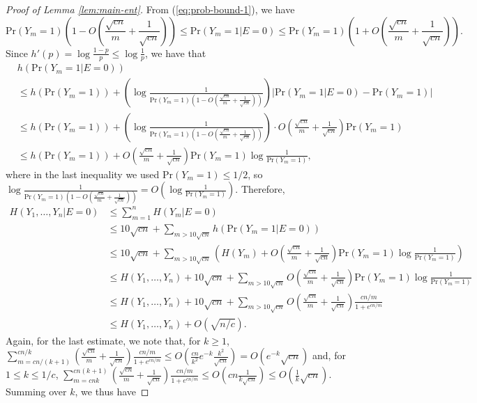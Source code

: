 \documentclass{daj}
\newcommand{\pr}{\mathrm{Pr}}
\begin{document}
\begin{proof}[Proof of Lemma \ref{lem:main-ent}]
From (\ref{eq:prob-bound-1}), we have
\[
    \pr(Y_m=1) \left(1 - O\left(\frac{\sqrt{cn}}{m} + \frac{1}{\sqrt{cn}}\right)\right)\le \pr(Y_m=1|E=0) \le \pr(Y_m=1) \left(1 + O\left(\frac{\sqrt{cn}}{m} + \frac{1}{\sqrt{cn}}\right)\right).
\]
Since $h'(p) = \log \frac{1-p}{p} \le \log \frac 1p$, we have that 
\begin{align*}
    &h(\pr(Y_m=1|E=0)) \\
    &\le h(\pr(Y_m=1)) + \left (\log \frac{1}{\pr(Y_m=1) \left(1 - O\left(\frac{\sqrt{cn}}{m} + \frac{1}{\sqrt{cn}}\right)\right)}\right ) \left | \pr(Y_m=1|E=0)-\pr(Y_m=1)\right |\\
    &\le h(\pr(Y_m=1)) + \left (\log \frac{1}{\pr(Y_m=1) \left(1 - O\left(\frac{\sqrt{cn}}{m} + \frac{1}{\sqrt{cn}}\right)\right)}\right ) \cdot O\left(\frac{\sqrt{cn}}{m} + \frac{1}{\sqrt{cn}}\right) \pr(Y_m=1) \\
    &\le h(\pr(Y_m=1)) +  O\left(\frac{\sqrt{cn}}{m} + \frac{1}{\sqrt{cn}}\right) \pr(Y_m=1) \log \frac{1}{\pr(Y_m=1)},
\end{align*}
where in the last inequality we used $\pr(Y_m=1) \le 1/2$, so $\log \frac{1}{\pr(Y_m=1) \left(1 - O\left(\frac{\sqrt{cn}}{m} + \frac{1}{\sqrt{cn}}\right)\right)} = O\left(\log \frac{1}{\pr(Y_m=1)}\right)$. 
Therefore, 
\begin{align*}
    H(Y_1,\dots,Y_n|E=0) &\le \sum_{m=1}^{n} H(Y_m | E=0)\\
    &\le 10\sqrt{cn} + \sum_{m>10\sqrt{cn}} h(\pr(Y_m=1|E=0)) \\
    &\le 10\sqrt{cn} + \sum_{m>10\sqrt{cn}} \left(H(Y_m) + O\left(\frac{\sqrt{cn}}{m} + \frac{1}{\sqrt{cn}}\right) \pr(Y_m=1) \log \frac{1}{\pr(Y_m=1)}\right)\\
    &\le H(Y_1,\dots,Y_n) + 10\sqrt{cn} + \sum_{m>10\sqrt{cn}}O\left(\frac{\sqrt{cn}}{m} + \frac{1}{\sqrt{cn}}\right) \pr(Y_m=1) \log \frac{1}{\pr(Y_m=1)}\\
    &\le H(Y_1,\dots,Y_n) + 10\sqrt{cn} + \sum_{m>10\sqrt{cn}} O\left(\frac{\sqrt{cn}}{m} + \frac{1}{\sqrt{cn}}\right) \frac{cn/m}{1+e^{cn/m}}\\
    &\le H(Y_1,\dots,Y_n) + O(\sqrt{n/c}). 
\end{align*}
Again, for the last estimate, we note that, for $k \ge 1$, $\sum_{m=cn/(k+1)}^{cn/k} \left(\frac{\sqrt{cn}}{m} + \frac{1}{\sqrt{cn}}\right) \frac{cn/m}{1+e^{cn/m}} \le O\left(\frac{cn}{k^2} e^{-k}\frac{k^2}{\sqrt{cn}}\right) = O(e^{-k}\sqrt{cn})$  and, for $1\le k\le 1/c$, $\sum_{m=cnk}^{cn(k+1)} \left(\frac{\sqrt{cn}}{m} + \frac{1}{\sqrt{cn}}\right) \frac{cn/m}{1+e^{cn/m}} \le O\left(cn\frac{1}{k\sqrt{cn}}\right) \le O\left(\frac{1}{k}\sqrt{cn}\right)$. Summing over $k$, we thus have 

\end{proof}
\end{document}

